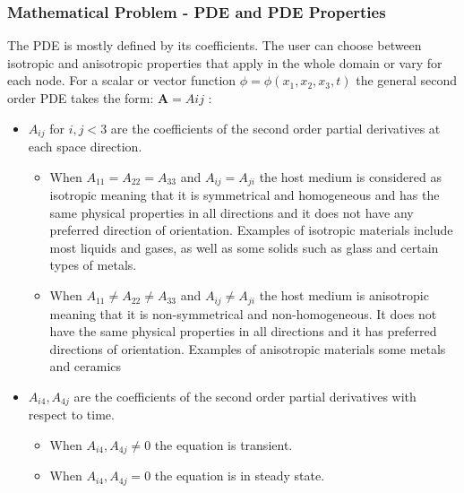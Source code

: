 \documentclass{article}
\begin{document}
	\subsubsection{Mathematical Problem - PDE and PDE Properties}
	The PDE is mostly defined by its coefficients. The user can choose between isotropic and anisotropic properties that apply in the whole domain or vary for each node. For a scalar or vector function $\phi = \phi(x_1, x_2, x_3,t)$ the general second order PDE takes the form:	$\boldsymbol{A} = Aij$ : 
	
	
	
	\begin{itemize}
		\item $A_{ij}$ for $i,j<3$ are the coefficients of the second order partial derivatives at each space direction. 
		
		\begin{itemize}
			\item When $A_{11}=A_{22}=A_{33}$ and $A_{ij}=A_{ji}$ the host medium is considered as isotropic meaning that it is symmetrical and homogeneous and has the same physical properties in all directions and it does not have any preferred direction of orientation. Examples of isotropic materials include most liquids and gases, as well as some solids such as glass and certain types of metals.
			
			\item When $A_{11} \neq A_{22} \neq A_{33}$ and $A_{ij}\neq A_{ji}$ the host medium is  anisotropic meaning that it is non-symmetrical and non-homogeneous. It does not have the same physical properties in all directions and it has preferred directions of orientation. Examples of anisotropic materials some metals and ceramics
		\end{itemize}
		
		\item $A_{i4},A_{4j}$ are the coefficients of the second order partial derivatives with respect to time.
		\begin{itemize}
			\item When $A_{i4},A_{4j} \neq 0$ the equation is transient. 
			\item When $A_{i4},A_{4j} = 0$ the equation is in steady state. 
		\end{itemize}
	\end{itemize}
	
\end{document}
